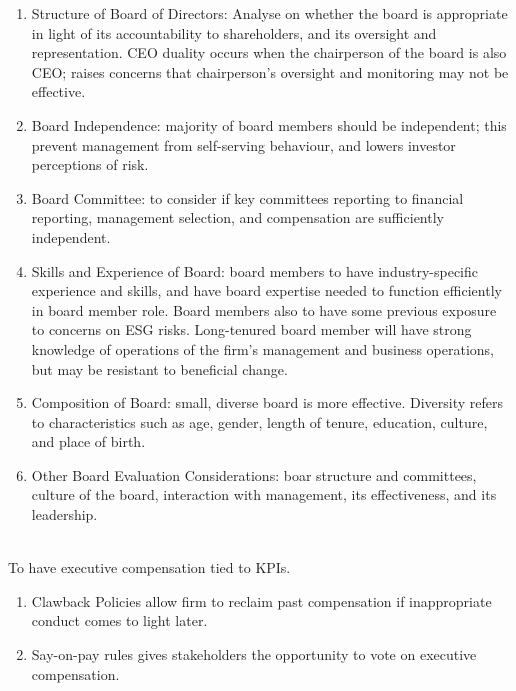 \begin{remark} 
\begin{enumerate}[label=\roman*.]
\setlength{\itemsep}{0pt}
\item Structure of Board of Directors: Analyse on whether the board is appropriate in light of its accountability to shareholders, and its oversight and representation. CEO duality occurs when the chairperson of the board is also CEO; raises concerns that chairperson's oversight and monitoring may not be effective.
\item Board Independence: majority of board members should be independent; this prevent management from self-serving behaviour, and lowers investor perceptions of risk.
\item Board Committee: to consider if key committees reporting to financial reporting, management selection, and compensation are sufficiently independent.
\item Skills and Experience of Board: board members to have industry-specific experience and skills, and have board expertise needed to function efficiently in board member role. Board members also to have some previous exposure to concerns on ESG risks. Long-tenured board member will have strong knowledge of operations of the firm's management and business operations, but may be resistant to beneficial change.
\item Composition of Board: small, diverse board is more effective. Diversity refers to characteristics such as age, gender, length of tenure, education, culture, and place of birth.
\item Other Board Evaluation Considerations: boar structure and committees, culture of the board, interaction with management, its effectiveness, and its leadership. 
\end{enumerate}
\end{remark}

\begin{remark} \\
To have executive compensation tied to KPIs. 
\begin{enumerate}[label=\roman*.]
\setlength{\itemsep}{0pt}
\item Clawback Policies allow firm to reclaim past compensation if inappropriate conduct comes to light later.
\item Say-on-pay rules gives stakeholders the opportunity to vote on executive compensation.
\end{enumerate}
\end{remark}

